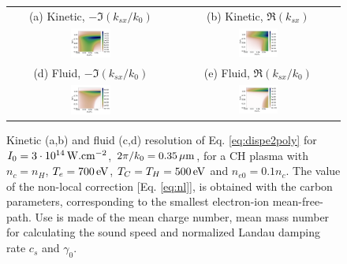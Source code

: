 \documentclass[
 reprint,
 amsmath,amssymb,
 aps,
]{revtex4-1}
\begin{document}
\begin{figure}
\begin{tabular}{cc}
(a) Kinetic, $-\Im(k_{sx}/k_0)$ &
(b)  Kinetic, $\Re(k_{sx})$ \\
\includegraphics[width=0.25\textwidth]{G_Te700eV_Ti500_3e14_3w_1e-1nc_CH.png}&
\includegraphics[width=0.25\textwidth]{k_Te700eV_Ti500_3e14_3w_1e-1nc_CH.png}\\
(d) Fluid, $-\Im(k_{sx}/k_0)$  &
(e) Fluid, $\Re(k_{sx}/k_0)$  \\
\includegraphics[width=0.25\textwidth]{Gf_Te700eV_Ti500_3e14_3w_1e-1nc_CH.png}&
\includegraphics[width=0.25\textwidth]{kf_Te700eV_Ti500_3e14_3w_1e-1nc_CH.png}
\end{tabular}
\caption{ \label{fig:dispeCH}  
Kinetic (a,b) and fluid (c,d) resolution of Eq. \eqref{eq:dispe2poly} for  $I_0 = 3\cdot 10^{14}\, \rm W.cm^{-2}$, $2\pi/k_0=0.35 \,\rm\mu m$, for a CH plasma with $n_c=n_H$, $T_e =700\,\rm  eV$, $T_C=T_H =500\,  \rm eV$ and $n_{e0}=0.1n_c$. The value of the non-local correction [Eq. \eqref{eq:nl}], is obtained with the carbon parameters, corresponding to the smallest electron-ion mean-free-path. Use is made of the mean charge number, mean mass number   for calculating the sound speed and normalized Landau damping rate $c_s$ and $\gamma_0$.
 }
\end{figure}
\end{document}
